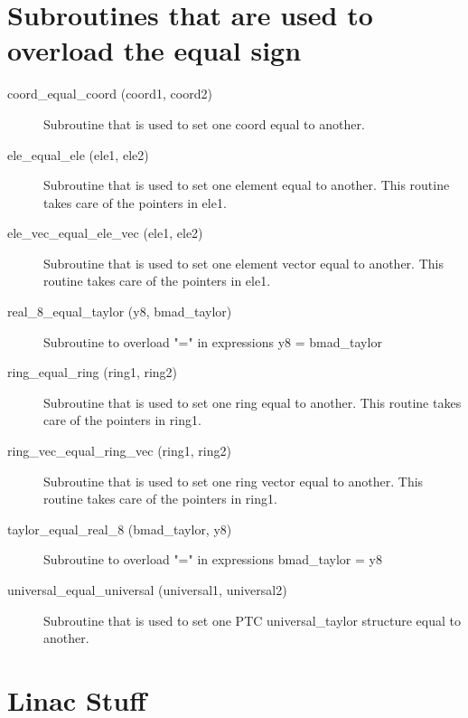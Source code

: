 \section{Subroutines that are used to overload the equal sign}
\label{r:equal}    

\begin{description}

\item[coord\_equal\_coord (coord1, coord2)] \Newline
Subroutine that is used to set one coord equal to another. 

\item[ele\_equal\_ele (ele1, ele2)] \Newline
Subroutine that is used to set one element equal to another. This routine takes care of the pointers in ele1. 

\item[ele\_vec\_equal\_ele\_vec (ele1, ele2)] \Newline
Subroutine that is used to set one element vector equal to another. This routine takes care of the pointers in ele1. 

\item[real\_8\_equal\_taylor (y8, bmad\_taylor)] \Newline
Subroutine to overload "=" in expressions y8 = bmad\_taylor 

\item[ring\_equal\_ring (ring1, ring2)] \Newline
Subroutine that is used to set one ring equal to another. This routine takes care of the pointers in ring1. 

\item[ring\_vec\_equal\_ring\_vec (ring1, ring2)] \Newline
Subroutine that is used to set one ring vector equal to another. This routine takes care of the pointers in ring1. 

\item[taylor\_equal\_real\_8 (bmad\_taylor, y8)] \Newline
Subroutine to overload "=" in expressions bmad\_taylor = y8 

\item[universal\_equal\_universal (universal1, universal2)] \Newline
Subroutine that is used to set one PTC universal\_taylor structure equal to another. 
\end{description}

\section{Linac Stuff}
\label{r:linac}    

